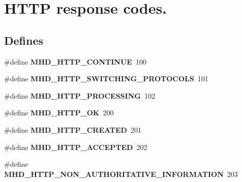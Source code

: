\hypertarget{group__httpcode}{\section{\-H\-T\-T\-P response codes.}
\label{group__httpcode}
}
\subsection*{\-Defines}
\begin{DoxyCompactItemize}
\item 
\hypertarget{group__httpcode_ga37710dce169530af32f5e8f2d742f80d}{\#define {\bfseries \-M\-H\-D\-\_\-\-H\-T\-T\-P\-\_\-\-C\-O\-N\-T\-I\-N\-U\-E}~100}\label{group__httpcode_ga37710dce169530af32f5e8f2d742f80d}

\item 
\hypertarget{group__httpcode_ga64b2ff266d6bdf3fe59975082ddde1be}{\#define {\bfseries \-M\-H\-D\-\_\-\-H\-T\-T\-P\-\_\-\-S\-W\-I\-T\-C\-H\-I\-N\-G\-\_\-\-P\-R\-O\-T\-O\-C\-O\-L\-S}~101}\label{group__httpcode_ga64b2ff266d6bdf3fe59975082ddde1be}

\item 
\hypertarget{group__httpcode_ga429fbf72864b6f5865129c19280323b4}{\#define {\bfseries \-M\-H\-D\-\_\-\-H\-T\-T\-P\-\_\-\-P\-R\-O\-C\-E\-S\-S\-I\-N\-G}~102}\label{group__httpcode_ga429fbf72864b6f5865129c19280323b4}

\item 
\hypertarget{group__httpcode_ga10c4aaf2fb9d0bed038acb99b2f92ce9}{\#define {\bfseries \-M\-H\-D\-\_\-\-H\-T\-T\-P\-\_\-\-O\-K}~200}\label{group__httpcode_ga10c4aaf2fb9d0bed038acb99b2f92ce9}

\item 
\hypertarget{group__httpcode_gad8cd388e726f2bf83b6f6354406cd0b1}{\#define {\bfseries \-M\-H\-D\-\_\-\-H\-T\-T\-P\-\_\-\-C\-R\-E\-A\-T\-E\-D}~201}\label{group__httpcode_gad8cd388e726f2bf83b6f6354406cd0b1}

\item 
\hypertarget{group__httpcode_gaa966c7253587440e832247e2a66e6a99}{\#define {\bfseries \-M\-H\-D\-\_\-\-H\-T\-T\-P\-\_\-\-A\-C\-C\-E\-P\-T\-E\-D}~202}\label{group__httpcode_gaa966c7253587440e832247e2a66e6a99}

\item 
\hypertarget{group__httpcode_ga8617e3be965ac6ecc554f6453e4dfaad}{\#define {\bfseries \-M\-H\-D\-\_\-\-H\-T\-T\-P\-\_\-\-N\-O\-N\-\_\-\-A\-U\-T\-H\-O\-R\-I\-T\-A\-T\-I\-V\-E\-\_\-\-I\-N\-F\-O\-R\-M\-A\-T\-I\-O\-N}~203}\label{group__httpcode_ga8617e3be965ac6ecc554f6453e4dfaad}


\end{DoxyCompactItemize}
